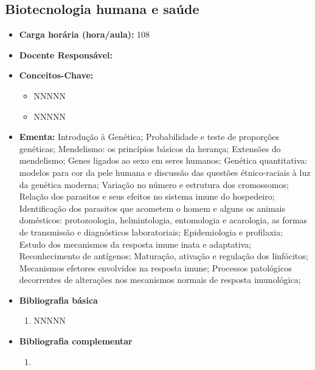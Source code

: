 \documentclass[11pt,fleqn]{book} %
\begin{document}
\subsection{Biotecnologia humana e saúde}\label{disc:biotecSaude}
\begin{itemize}
	\item \textbf{Carga horária (hora/aula):} 108
	\item \textbf{Docente Responsável:}
	\item \textbf{Conceitos-Chave:}
	\begin{itemize}
		\item NNNNN
		\item NNNNN
	\end{itemize}
	\item \textbf{Ementa:} 
	Introdução à Genética;
	Probabilidade e teste de proporções genéticas; 
	Mendelismo: os princípios básicos da herança; 
	Extensões do mendelismo; 
	Genes ligados ao sexo em seres humanos;
	Genética quantitativa: modelos para cor da pele humana e discussão das questões étnico-raciais à luz da genética moderna;
	Variação no número e estrutura dos cromossomos;
	Relação dos parasitos e seus efeitos no sistema imune do hospedeiro; 
	Identificação dos parasitos que acometem o homem e alguns os animais domésticos: protozoologia, helmintologia, entomologia e acarologia, as formas de transmissão e diagnósticos laboratoriais; 
	Epidemiologia e profilaxia; 
	Estudo dos mecanismos da resposta imune inata e adaptativa; 
	Reconhecimento de antígenos; 
	Maturação, ativação e regulação dos linfócitos;
	Mecanismos efetores envolvidos na resposta imune;
	Processos patológicos decorrentes de alterações nos mecanismos normais de resposta imunológica;
	\item \textbf{Bibliografia básica}
	\begin{enumerate}
		\item NNNNN
	\end{enumerate}
	\item \textbf{Bibliografia complementar}
	\begin{enumerate}
		\item 
	\end{enumerate}	
\end{itemize}


\newpage
\end{document}
